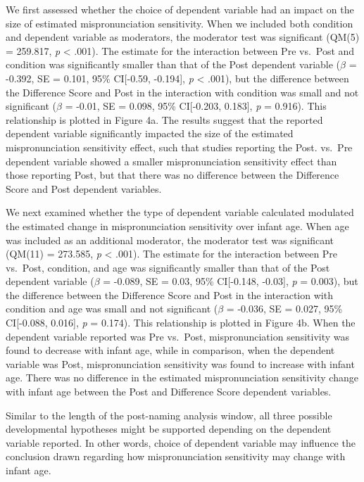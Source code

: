 \documentclass[man]{apa6}
\theoremstyle{definition}
\theoremstyle{definition}
\theoremstyle{definition}
\theoremstyle{remark}
\begin{document}
We first assessed whether the choice of dependent variable had an impact
on the size of estimated mispronunciation sensitivity. When we included
both condition and dependent variable as moderators, the moderator test
was significant (QM(5) = 259.817, \emph{p} \textless{} .001). The
estimate for the interaction between Pre vs.~Post and condition was
significantly smaller than that of the Post dependent variable
(\(\beta\) = -0.392, SE = 0.101, 95\% CI{[}-0.59, -0.194{]}, \emph{p}
\textless{} .001), but the difference between the Difference Score and
Post in the interaction with condition was small and not significant
(\(\beta\) = -0.01, SE = 0.098, 95\% CI{[}-0.203, 0.183{]}, \emph{p} =
0.916). This relationship is plotted in Figure 4a. The results suggest
that the reported dependent variable significantly impacted the size of
the estimated mispronunciation sensitivity effect, such that studies
reporting the Post. vs.~Pre dependent variable showed a smaller
mispronunciation sensitivity effect than those reporting Post, but that
there was no difference between the Difference Score and Post dependent
variables.

We next examined whether the type of dependent variable calculated
modulated the estimated change in mispronunciation sensitivity over
infant age. When age was included as an additional moderator, the
moderator test was significant (QM(11) = 273.585, \emph{p} \textless{}
.001). The estimate for the interaction between Pre vs.~Post, condition,
and age was significantly smaller than that of the Post dependent
variable (\(\beta\) = -0.089, SE = 0.03, 95\% CI{[}-0.148, -0.03{]},
\emph{p} = 0.003), but the difference between the Difference Score and
Post in the interaction with condition and age was small and not
significant (\(\beta\) = -0.036, SE = 0.027, 95\% CI{[}-0.088, 0.016{]},
\emph{p} = 0.174). This relationship is plotted in Figure 4b. When the
dependent variable reported was Pre vs.~Post, mispronunciation
sensitivity was found to decrease with infant age, while in comparison,
when the dependent variable was Post, mispronunciation sensitivity was
found to increase with infant age. There was no difference in the
estimated mispronunciation sensitivity change with infant age between
the Post and Difference Score dependent variables.

Similar to the length of the post-naming analysis window, all three
possible developmental hypotheses might be supported depending on the
dependent variable reported. In other words, choice of dependent
variable may influence the conclusion drawn regarding how
mispronunciation sensitivity may change with infant age.
\end{document}
